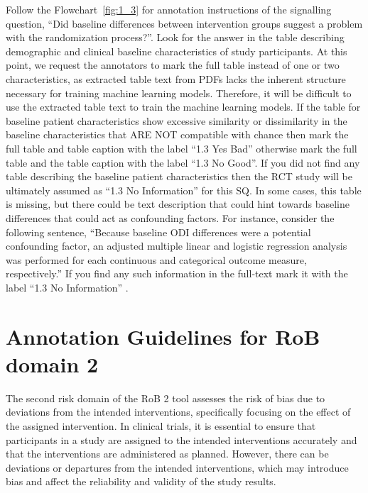 \documentclass[sn-mathphys,Numbered]{sn-jnl}%
\begin{document}
%
%
%
Follow the Flowchart~\ref{fig:1_3} for annotation instructions of the signalling question, ``Did baseline differences between intervention groups suggest a problem with the randomization process?''.
Look for the answer in the table describing demographic and clinical baseline characteristics of study participants. 
At this point, we request the annotators to mark the full table instead of one or two characteristics, as extracted table text from PDFs lacks the inherent structure necessary for training machine learning models.
Therefore, it will be difficult to use the extracted table text to train the machine learning models. 
If the table for baseline patient characteristics show excessive similarity or dissimilarity in the baseline characteristics that ARE NOT compatible with chance then mark the full table and table caption with the label ``1.3 Yes Bad'' otherwise mark the full table and the table caption with the label ``1.3 No Good''.
If you did not find any table describing the baseline patient characteristics then the RCT study will be ultimately assumed as ``1.3 No Information'' for this SQ.
In some cases, this table is missing, but there could be text description that could hint towards baseline differences that could act as confounding factors.
For instance, consider the following sentence, ``Because baseline ODI differences were a potential confounding factor, an adjusted multiple linear and logistic regression analysis was performed for each continuous and categorical outcome measure, respectively.''%
If you find any such information in the full-text mark it with the label ``1.3 No Information'' .
%
%
%
\section*{Annotation Guidelines for RoB domain 2}
\label{sec:dom2}
%
The second risk domain of the RoB 2 tool assesses the risk of bias due to deviations from the intended interventions, specifically focusing on the effect of the assigned intervention.
In clinical trials, it is essential to ensure that participants in a study are assigned to the intended interventions accurately and that the interventions are administered as planned.
However, there can be deviations or departures from the intended interventions, which may introduce bias and affect the reliability and validity of the study results.
\end{document}
